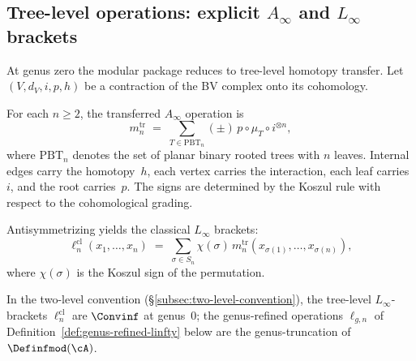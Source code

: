 \subsection{Tree-level operations: explicit \texorpdfstring{$A_\infty$}{A-infinity} and \texorpdfstring{$L_\infty$}{L-infinity} brackets}

At genus zero the modular package reduces to tree-level homotopy
transfer. Let $(V, d_V, i, p, h)$ be a contraction of the BV complex
onto its cohomology.

\begin{definition}
\label{def:tree-level-ainfty}
For each $n \ge 2$, the transferred $A_\infty$ operation is
\begin{equation}\label{eq:tree-mn}
 m_n^{\mathrm{tr}}
 \;=\;
 \sum_{T \in \mathrm{PBT}_n} (\pm)\, p \circ \mu_T \circ i^{\otimes n},
\end{equation}
where $\mathrm{PBT}_n$ denotes the set of planar binary rooted trees
with $n$ leaves. Internal edges carry the homotopy~$h$, each vertex
carries the interaction, each leaf carries~$i$, and the root carries~$p$.
The signs are determined by the Koszul rule with respect to the
cohomological grading.
\end{definition}

\begin{definition}
\label{def:tree-level-linfty}
Antisymmetrizing yields the classical $L_\infty$ brackets:
\begin{equation}\label{eq:tree-ell}
 \ell_n^{\mathrm{cl}}(x_1, \dotsc, x_n)
 \;=\;
 \sum_{\sigma \in S_n} \chi(\sigma)\,
 m_n^{\mathrm{tr}}(x_{\sigma(1)}, \dotsc, x_{\sigma(n)}),
\end{equation}
where $\chi(\sigma)$ is the Koszul sign of the permutation.
\end{definition}

\begin{remark}
\label{rem:quantum-corrections-two-level}
In the two-level convention
(\S\ref{subsec:two-level-convention}), the tree-level
$L_\infty$-brackets $\ell_n^{\mathrm{cl}}$ are $\Convinf$ at
genus~$0$; the genus-refined operations $\ell_{g,n}$ of
Definition~\ref{def:genus-refined-linfty} below are the
genus-truncation of $\Definfmod(\cA)$.
\end{remark}

